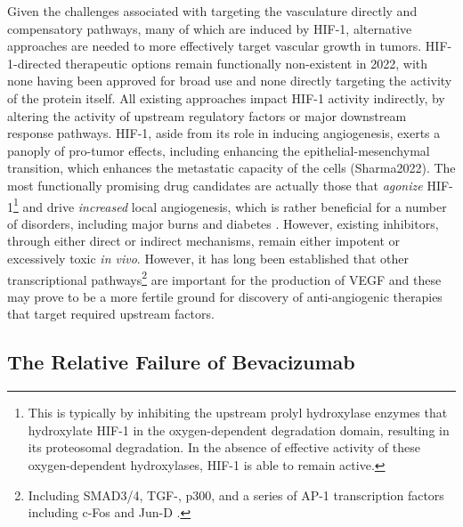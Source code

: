 Given the challenges associated with targeting the vasculature directly and compensatory pathways, many of which are induced by HIF-1\textalpha, alternative approaches are needed to more effectively target vascular growth in tumors. HIF-1\textalpha-directed therapeutic options remain functionally non-existent in 2022, with none having been approved for broad use and none directly targeting the activity of the protein itself. All existing approaches impact HIF-1\textalpha{} activity indirectly, by altering the activity of upstream regulatory factors or major downstream response pathways. HIF-1\textalpha, aside from its role in inducing angiogenesis, exerts a panoply of pro-tumor effects, including enhancing the epithelial-mesenchymal transition, which enhances the metastatic capacity of the cells (Sharma2022). The most functionally promising drug candidates are actually those that \textit{agonize} HIF-1\textalpha\footnote{This is typically by inhibiting the upstream prolyl hydroxylase enzymes that hydroxylate HIF-1\textalpha{} in the oxygen-dependent degradation domain, resulting in its proteosomal degradation. In the absence of effective activity of these oxygen-dependent hydroxylases, HIF-1\textalpha{} is able to remain active.} and drive \textit{increased} local angiogenesis, which is rather beneficial for a number of disorders, including major burns and diabetes \citep{Dor2002, DeRosa2018, Atluri2008}. However, existing inhibitors, through either direct or indirect mechanisms, remain either impotent or excessively toxic \textit{in vivo}. However, it has long been established that other transcriptional pathways\footnote{Including SMAD3/4, TGF-\textbeta, p300, and a series of AP-1 transcription factors including c-Fos and Jun-D \citep{Jeon2006, Nam2010, Gray2005, Kwon2012, Thangarajah2009, Marconcini1999, Schmidt2007, Catar2013, Yoshitomi2021}.} are important for the production of VEGF and these may prove to be a more fertile ground for discovery of anti-angiogenic therapies that target required upstream factors.

\subsection{The Relative Failure of Bevacizumab}\label{bevacizumab}

